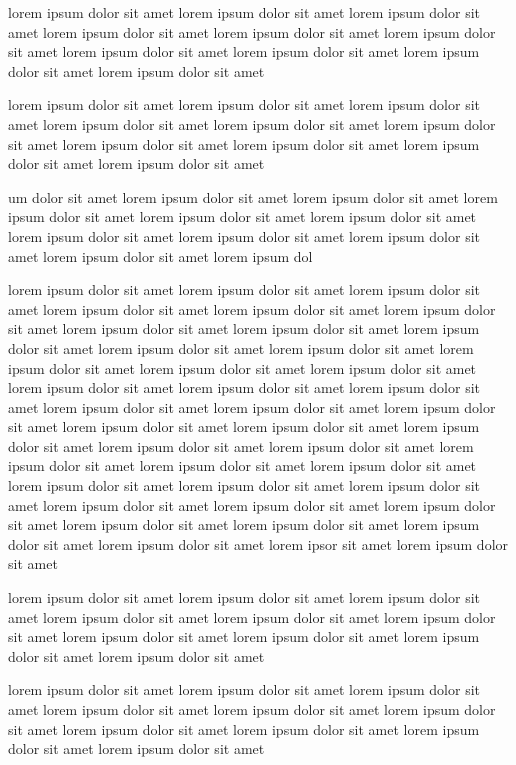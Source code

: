 lorem ipsum dolor sit amet lorem ipsum dolor sit amet lorem ipsum dolor sit amet
lorem ipsum dolor sit amet lorem ipsum dolor sit amet 
lorem ipsum dolor sit amet lorem ipsum dolor sit amet lorem ipsum dolor sit amet
lorem ipsum dolor sit amet lorem ipsum dolor sit amet 


lorem ipsum dolor sit amet lorem ipsum dolor sit amet lorem ipsum dolor sit amet
lorem ipsum dolor sit amet lorem ipsum dolor sit amet 
lorem ipsum dolor sit amet lorem ipsum dolor sit amet lorem ipsum dolor sit amet
lorem ipsum dolor sit amet lorem ipsum dolor sit amet 

um dolor sit amet lorem ipsum dolor sit amet 
lorem ipsum dolor sit amet lorem ipsum dolor sit amet lorem ipsum dolor sit amet
lorem ipsum dolor sit amet lorem ipsum dolor sit amet 
lorem ipsum dolor sit amet lorem ipsum dolor sit amet lorem ipsum dolor sit amet
lorem ipsum dol



lorem ipsum dolor sit amet lorem ipsum dolor sit amet lorem ipsum dolor sit amet
lorem ipsum dolor sit amet lorem ipsum dolor sit amet 
lorem ipsum dolor sit amet lorem ipsum dolor sit amet lorem ipsum dolor sit amet
lorem ipsum dolor sit amet lorem ipsum dolor sit amet 
lorem ipsum dolor sit amet lorem ipsum dolor sit amet lorem ipsum dolor sit amet
lorem ipsum dolor sit amet lorem ipsum dolor sit amet 
lorem ipsum dolor sit amet lorem ipsum dolor sit amet lorem ipsum dolor sit amet
lorem ipsum dolor sit amet lorem ipsum dolor sit amet 
lorem ipsum dolor sit amet lorem ipsum dolor sit amet lorem ipsum dolor sit amet
lorem ipsum dolor sit amet lorem ipsum dolor sit amet 
lorem ipsum dolor sit amet lorem ipsum dolor sit amet lorem ipsum dolor sit amet
lorem ipsum dolor sit amet lorem ipsum dolor sit amet 
lorem ipsum dolor sit amet lorem ipsum dolor sit amet lorem ipsum dolor sit amet
lorem ipsum dolor sit amet lorem ipsum dolor sit amet 
lorem ipsum dolor sit amet lorem ipsum dolor sit amet lorem ipsum dolor sit amet
lorem ipsor sit amet lorem ipsum dolor sit amet 


lorem ipsum dolor sit amet lorem ipsum dolor sit amet lorem ipsum dolor sit amet
lorem ipsum dolor sit amet lorem ipsum dolor sit amet 
lorem ipsum dolor sit amet lorem ipsum dolor sit amet lorem ipsum dolor sit amet
lorem ipsum dolor sit amet lorem ipsum dolor sit amet 


lorem ipsum dolor sit amet lorem ipsum dolor sit amet lorem ipsum dolor sit amet
lorem ipsum dolor sit amet lorem ipsum dolor sit amet 
lorem ipsum dolor sit amet lorem ipsum dolor sit amet lorem ipsum dolor sit amet
lorem ipsum dolor sit amet lorem ipsum dolor sit amet 


